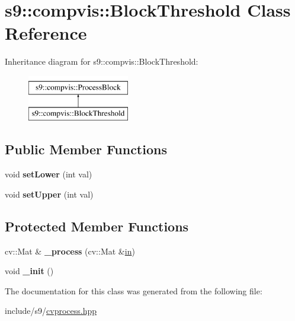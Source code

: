 \hypertarget{classs9_1_1compvis_1_1BlockThreshold}{\section{s9\-:\-:compvis\-:\-:\-Block\-Threshold \-Class \-Reference}
\label{classs9_1_1compvis_1_1BlockThreshold}
}
\-Inheritance diagram for s9\-:\-:compvis\-:\-:\-Block\-Threshold\-:\begin{figure}[H]
\begin{center}
\leavevmode
\includegraphics[height=2.000000cm]{classs9_1_1compvis_1_1BlockThreshold}
\end{center}
\end{figure}
\subsection*{\-Public \-Member \-Functions}
\begin{DoxyCompactItemize}
\item 
\hypertarget{classs9_1_1compvis_1_1BlockThreshold_a5351e7d65bb6cc9e0b4fb34e82e25fe7}{void {\bfseries set\-Lower} (int val)}\label{classs9_1_1compvis_1_1BlockThreshold_a5351e7d65bb6cc9e0b4fb34e82e25fe7}

\item 
\hypertarget{classs9_1_1compvis_1_1BlockThreshold_acc999ee27694a40272d1c3ce1f880c73}{void {\bfseries set\-Upper} (int val)}\label{classs9_1_1compvis_1_1BlockThreshold_acc999ee27694a40272d1c3ce1f880c73}

\end{DoxyCompactItemize}
\subsection*{\-Protected \-Member \-Functions}
\begin{DoxyCompactItemize}
\item 
\hypertarget{classs9_1_1compvis_1_1BlockThreshold_a8de7c478f270ad3e4a96034763b479bf}{cv\-::\-Mat \& {\bfseries \-\_\-process} (cv\-::\-Mat \&\hyperlink{structin}{in})}\label{classs9_1_1compvis_1_1BlockThreshold_a8de7c478f270ad3e4a96034763b479bf}

\item 
\hypertarget{classs9_1_1compvis_1_1BlockThreshold_a6827d75bf8fda3f7f7356f38103752b6}{void {\bfseries \-\_\-init} ()}\label{classs9_1_1compvis_1_1BlockThreshold_a6827d75bf8fda3f7f7356f38103752b6}

\end{DoxyCompactItemize}


\-The documentation for this class was generated from the following file\-:\begin{DoxyCompactItemize}
\item 
include/s9/\hyperlink{cvprocess_8hpp}{cvprocess.\-hpp}\end{DoxyCompactItemize}

